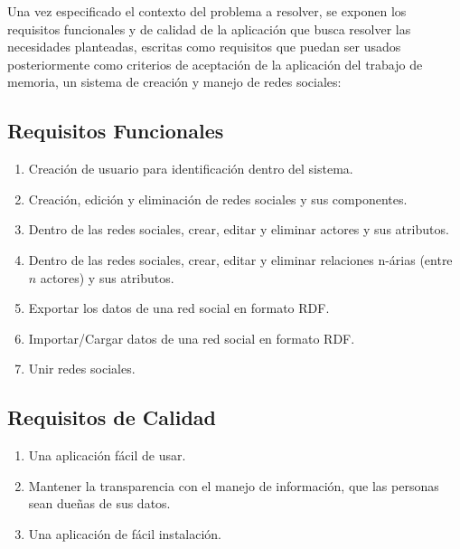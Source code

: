 Una vez especificado el contexto del problema a resolver, se exponen los requisitos funcionales y de calidad de la aplicación que busca resolver las necesidades planteadas, escritas como requisitos que puedan ser usados posteriormente como criterios de aceptación de la aplicación del trabajo de memoria, un sistema de creación y manejo de redes sociales:

\subsection{Requisitos Funcionales} %
\label{sub:requisitos_funcionales}

\begin{enumerate}
  \item Creación de usuario para identificación dentro del sistema.
  \item Creación, edición y eliminación de redes sociales y sus componentes.
  \item Dentro de las redes sociales, crear, editar y eliminar actores y sus atributos.
  \item Dentro de las redes sociales, crear, editar y eliminar relaciones n-árias (entre $n$ actores) y sus atributos.
  \item Exportar los datos de una red social en formato RDF.
  \item Importar/Cargar datos de una red social en formato RDF.
  \item Unir redes sociales.
\end{enumerate}


\subsection{Requisitos de Calidad} %
\label{sub:requisitos_de_calidad}

\begin{enumerate}
  \item Una aplicación fácil de usar.
  \item Mantener la transparencia con el manejo de información, que las personas sean dueñas de sus datos.
  \item Una aplicación de fácil instalación.
\end{enumerate}


